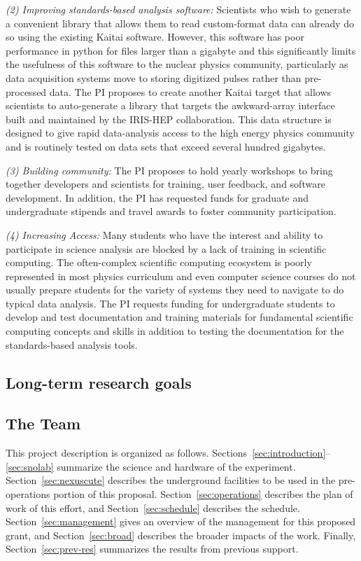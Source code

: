 {\it (2) Improving standards-based analysis software:} Scientists who wish to generate a convenient library that allows them to read custom-format data can already do so using the existing Kaitai software.  However, this software has poor performance in python for files larger than a gigabyte and this significantly limits the usefulness of this software to the nuclear physics community, particularly as data acquisition systems move to storing digitized pulses rather than pre-processed data.  The PI proposes to create another Kaitai target that allows scientists to auto-generate a library that targets the awkward-array interface built and maintained by the IRIS-HEP collaboration.  This data structure is designed to give rapid data-analysis access to the high energy physics community and is routinely tested on data sets that exceed several hundred gigabytes.

{\it (3) Building community:} The PI proposes to hold yearly workshops to bring together developers and scientists for training, user feedback, and software development.  In addition, the PI has requested funds for graduate and undergraduate stipends and travel awards to foster community participation.

{\it (4) Increasing Access:} Many students who have the interest and ability to participate in science analysis are blocked by a lack of training in scientific computing.  The often-complex scientific computing ecosystem is poorly represented in most physics curriculum and even computer science courses do not usually prepare students for the variety of systems they need to navigate to do typical data analysis.  The PI requests funding for undergraduate students to develop and test documentation and training materials for fundamental scientific computing concepts and skills in addition to testing the documentation for the standards-based analysis tools.

\subsection{Long-term research goals}


\subsection{The Team}

 This project description is organized as follows. 
Sections~\ref{sec:introduction}--\ref{sec:snolab} summarize the science and hardware of the \scs experiment. 
Section~\ref{sec:nexuscute} describes the underground facilities to be used in the pre-operations portion of this proposal.
Section~\ref{sec:operations} describes the plan of work of this effort, and Section~\ref{sec:schedule} describes the schedule.
Section~\ref{sec:management} gives an overview of the management for this proposed grant, and Section~\ref{sec:broad} describes the broader impacts of the work.
Finally, Section~\ref{sec:prev-res} summarizes the results from previous support.

